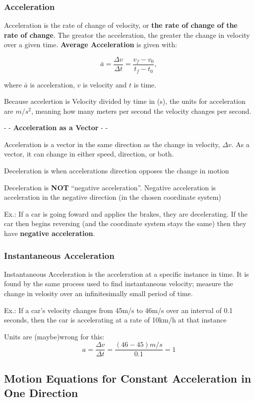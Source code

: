 \documentclass{article}
\begin{document}
\subsubsection{Acceleration}
Acceleration is the rate of change of velocity, or \textbf{the rate of change of the rate of change}.
The greator the acceleration, the greater the change in velocity over a given time.
\textbf{Average Acceleration} is given with:

\[\bar{a} = \frac{\Delta{v}}{\Delta{t}} = \frac{v_f - v_0}{t_f - t_0},\]

where $\bar{a}$ is acceleration, $v$ is velocity and $t$ is time.

Because accelertion is Velocity divided by time in (s), the units for acceleration are $m/s^2$, meaning how many meters per second the velocity changes per second.

- - \textbf{Acceleration as a Vector} - -

Acceleration is a vector in the same direction as the change in velocity, $\Delta{v}$. As a vector, it can change in either speed, direction, or both.

Deceleration is when accelerations direction opposes the change in motion

Deceleration is \textbf{NOT} ``negative acceleration''. Negative acceleration is acceleration in the negative direction (in the chosen coordinate system)

Ex.: If a car is going foward and applies the brakes, they are decelerating. If the car then begins reversing (and the coordinate system stays the same) then they have \textbf{negative acceleration}.

\subsubsection{Instantaneous Acceleration}
Instantaneous Acceleration is the acceleration at a specific instance in time. It is found by the same process used to find instantaneous velocity; measure the change in velosity over an infinitesimally small period of time.

Ex.: If a car's velocity changes from 45m/s to 46m/s over an interval of 0.1 seconds, then the car is accelerating at a rate of 10km/h at that instance

Units are (maybe)wrong for this:
\[a = \frac{\Delta{v}}{\Delta{t}} = \frac{(46-45)m/s}{0.1} = 1\]


\subsection{Motion Equations for Constant Acceleration in One Direction}
\end{document}
